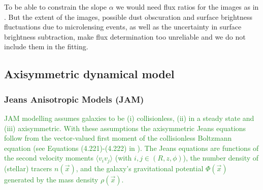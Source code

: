 \documentclass[useAMS,usenatbib]{mnras}
\newcommand*\diff{\mathop{}\!\mathrm{d}}
\newcommand*\Diff[1]{\mathop{}\!\mathrm{d^#1}}
\newcommand{\vect}[1]{\vec{#1}} %
\newcommand{\NEW}[1]{\textcolor{ForestGreen}{#1}}
\newcommand{\OLD}[1]{}
\begin{document}
To be able to constrain the slope $\alpha$ we would need flux ratios for the images as in \citet{GlennEC}. But the extent of the images, possible dust obscuration and surface brightness fluctuations due to microlensing events, as well as the uncertainty in surface brightness subtraction, make flux determination too unreliable and we do not include them in the fitting.

\subsection{Axisymmetric dynamical model} \label{sec:model_JAM}

\subsubsection{Jeans Anisotropic Models (JAM)} \label{sec:model_JAM_JAM}

\OLD{JAM modelling assumes galaxies to be (i) collisionless (i.e., the collisionless Boltzmann equation for the distribution function $f(\vect{x},\vect{v},t)$ has to be satisfied, $\frac{\diff f(\vect{x},\vect{v},t)}{\diff t} = 0$), (ii) in a steady state ($\frac{\partial}{\partial t} = 0$), (iii) axisymmetric (best described in cylindrical coordinates $(R,z,\phi)$ and $\frac{\partial}{\partial \phi} = 0$). From this follow the axisymmetric Jeans equations as the vector-valued first moment of the Boltzmann equation, i.e.,
\begin{equation*}
\int \vect{v} \frac{\diff f}{\diff t} \Diff3 v = 0.
\end{equation*}}
\NEW{JAM modelling assumes galaxies to be (i) collisionless, (ii) in a steady state and (iii) axisymmetric. With these assumptions the axisymmetric Jeans equations follow from the vector-valued first moment of the collisionless Boltzmann equation (see Equations (4.221)-(4.222) in \citet{2008gady.book.....B}). The Jeans equations are functions of the second velocity moments $\langle v_i v_j\rangle$ (with $i,j\in(R,z,\phi)$), the number density of (stellar) tracers $n(\vect{x})$, and the galaxy's gravitational potential $\Phi(\vect{x})$ generated by the mass density $\rho(\vect{x})$.} 
\end{document}
